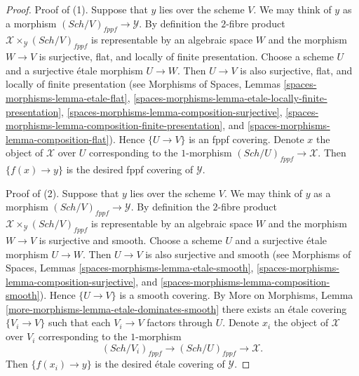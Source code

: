 \documentclass{stacks-project}
\theoremstyle{plain}
\theoremstyle{definition}
\theoremstyle{remark}
\numberwithin{equation}{subsection}
\def\Sch{\mathit{Sch}}
\begin{document}
\begin{proof}
Proof of (1). Suppose that $y$ lies over the scheme $V$.
We may think of $y$ as a morphism $(\Sch/V)_{fppf} \to \mathcal{Y}$.
By definition the $2$-fibre product
$\mathcal{X} \times_\mathcal{Y} (\Sch/V)_{fppf}$
is representable by an algebraic space $W$ and the morphism
$W \to V$ is surjective, flat, and locally of finite presentation.
Choose a scheme $U$ and a surjective \'etale morphism $U \to W$.
Then $U \to V$ is also surjective, flat, and locally of finite presentation
(see Morphisms of Spaces, Lemmas
\ref{spaces-morphisms-lemma-etale-flat},
\ref{spaces-morphisms-lemma-etale-locally-finite-presentation},
\ref{spaces-morphisms-lemma-composition-surjective},
\ref{spaces-morphisms-lemma-composition-finite-presentation}, and
\ref{spaces-morphisms-lemma-composition-flat}).
Hence $\{U \to V\}$ is an fppf covering. Denote $x$ the object of
$\mathcal{X}$ over $U$ corresponding to the $1$-morphism
$(\Sch/U)_{fppf} \to \mathcal{X}$. Then $\{f(x) \to y\}$ is
the desired fppf covering of $\mathcal{Y}$.

\medskip\noindent
Proof of (2). Suppose that $y$ lies over the scheme $V$.
We may think of $y$ as a morphism $(\Sch/V)_{fppf} \to \mathcal{Y}$.
By definition the $2$-fibre product
$\mathcal{X} \times_\mathcal{Y} (\Sch/V)_{fppf}$
is representable by an algebraic space $W$ and the morphism
$W \to V$ is surjective and smooth.
Choose a scheme $U$ and a surjective \'etale morphism $U \to W$.
Then $U \to V$ is also surjective and smooth
(see Morphisms of Spaces, Lemmas
\ref{spaces-morphisms-lemma-etale-smooth},
\ref{spaces-morphisms-lemma-composition-surjective}, and
\ref{spaces-morphisms-lemma-composition-smooth}).
Hence $\{U \to V\}$ is a smooth covering. By
More on Morphisms, Lemma \ref{more-morphisms-lemma-etale-dominates-smooth}
there exists an \'etale covering $\{V_i \to V\}$ such that
each $V_i \to V$ factors through $U$. Denote $x_i$ the object of
$\mathcal{X}$ over $V_i$ corresponding to the $1$-morphism
$$
(\Sch/V_i)_{fppf} \to (\Sch/U)_{fppf} \to \mathcal{X}.
$$
Then $\{f(x_i) \to y\}$ is
the desired \'etale covering of $\mathcal{Y}$.
\end{proof}
\end{document}
